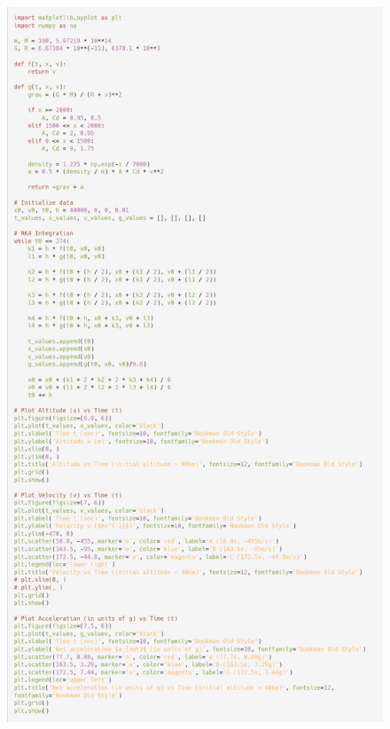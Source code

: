 \documentclass[a4paper, 14pt]{extarticle}
\begin{document}
\begin{figure}[H]
\centering
\includegraphics[width=0.87\linewidth]{2.png}
\caption*{}
\end{figure}
\end{document}
